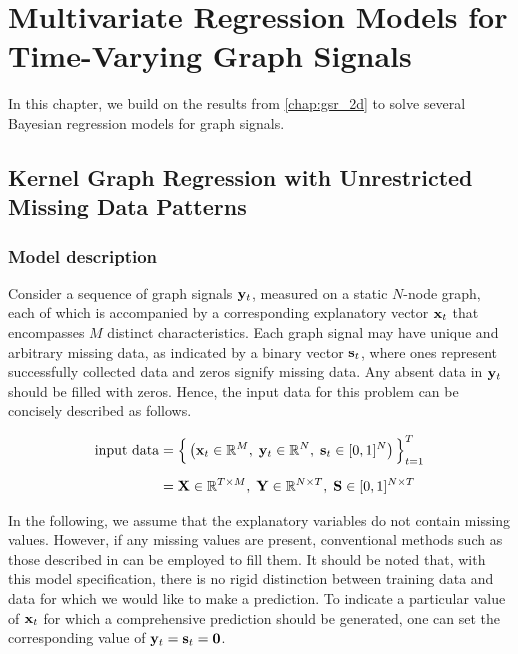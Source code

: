 \chapter{Multivariate Regression Models for Time-Varying Graph Signals}


\label{chap:kgr_rnc_2d}

In this chapter, we build on the results from \cref{chap:gsr_2d} to solve several Bayesian regression models for graph signals. 


\section{Kernel Graph Regression with Unrestricted Missing Data Patterns}

\label{sec:kgr_mdp}

\subsection{Model description}

\label{sec:kgr_model_desc}

Consider a sequence of graph signals $\mathbf{y}_t$, measured on a static $N$-node graph, each of which is accompanied by a corresponding explanatory vector $\mathbf{x}_t$ that encompasses $M$ distinct characteristics. Each graph signal may have unique and arbitrary missing data, as indicated by a binary vector $\mathbf{s}_t$, where ones represent successfully collected data and zeros signify missing data. Any absent data in $\mathbf{y}_t$ should be filled with zeros. Hence, the input data for this problem can be concisely described as follows. 


\begin{align*}
    \text{input data} &= \Big\{\left(\mathbf{x}_t \in \mathbb{R}^{M}, \; \mathbf{y}_t \in \mathbb{R}^{N}, \; \mathbf{s}_t \in [0, 1]^{N} \right)\Big\}_{t=1}^T \\[0.2cm]
    &= \mathbf{X} \in \mathbb{R}^{T \times M}, \; \mathbf{Y} \in \mathbb{R}^{N \times T}, \; \mathbf{S} \in [0, 1]^{N \times T}
\end{align*}

 In the following, we assume that the explanatory variables do not contain missing values. However, if any missing values are present, conventional methods such as those described in \cite{Little2019} can be employed to fill them. It should be noted that, with this model specification, there is no rigid distinction between training data and data for which we would like to make a prediction. To indicate a particular value of $\mathbf{x}_t$ for which a comprehensive prediction should be generated, one can set the corresponding value of $\mathbf{y}_t = \mathbf{s}_t = \mathbf{0}$. 

